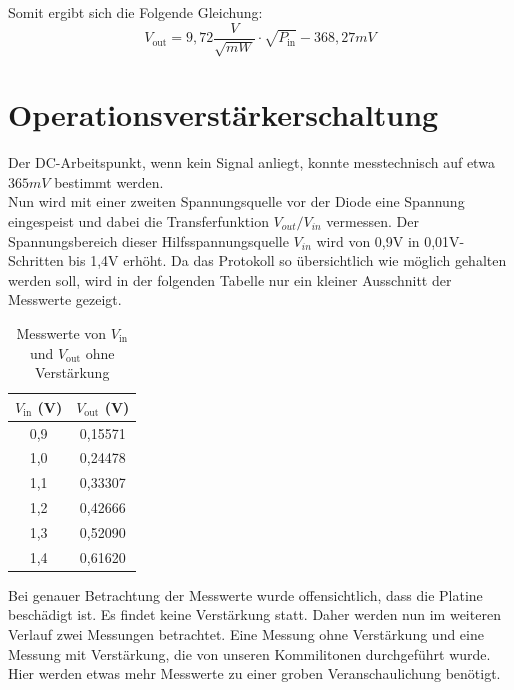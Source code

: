 Somit ergibt sich die Folgende Gleichung:
\begin{equation}
    V_\text{out} = 9,72 \frac{V}{\sqrt{mW}} \cdot \sqrt{P_\text{in}} - 368,27 mV
\end{equation}
\section{Operationsverstärkerschaltung} %
Der DC-Arbeitspunkt, wenn kein Signal anliegt, konnte messtechnisch auf etwa $365mV$ bestimmt werden.
\\
Nun wird mit einer zweiten Spannungsquelle vor der Diode eine Spannung eingespeist und dabei die Transferfunktion
$V_{out}/V_{in}$ vermessen. Der Spannungsbereich dieser Hilfsspannungsquelle $V_{in}$ wird von 0,9V in 0,01V-Schritten bis 1,4V erhöht.
Da das Protokoll so übersichtlich wie möglich gehalten werden soll, wird in der folgenden Tabelle nur ein kleiner Ausschnitt der
Messwerte gezeigt.
\begin{table}[h]
\centering
\begin{tabular}{|c|c|}
\hline
$V_{\text{in}}$ (V) & $V_{\text{out}}$ (V) \\
\hline
0{,}9 & 0{,}15571 \\
1{,}0 & 0{,}24478 \\
1{,}1 & 0{,}33307 \\
1{,}2 & 0{,}42666 \\
1{,}3 & 0{,}52090 \\
1{,}4 & 0{,}61620 \\
\hline
\end{tabular}
\caption{Messwerte von $V_{\text{in}}$ und $V_{\text{out}}$ ohne Verstärkung}
\end{table}
Bei genauer Betrachtung der Messwerte wurde offensichtlich, dass die Platine beschädigt ist. Es findet keine Verstärkung
statt. Daher werden nun im weiteren Verlauf zwei Messungen betrachtet. Eine Messung ohne Verstärkung und eine Messung mit Verstärkung, die von 
unseren Kommilitonen durchgeführt wurde. Hier werden etwas mehr Messwerte zu einer groben Veranschaulichung benötigt. \\


